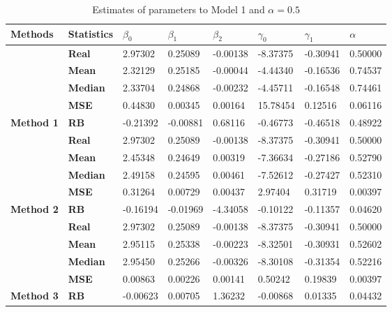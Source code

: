 \begin{table}[h]

\caption{\label{tab:Est_model_1_Alpha0.5}Estimates of parameters to Model 1 and $\alpha=0.5$}
\centering
\begin{tabular}[t]{>{}l>{}lllllll}
\toprule
Methods & Statistics & $\beta_0$ & $\beta_1$ & $\beta_2$ & $\gamma_0$ & $\gamma_1$ & $\alpha$\\
\midrule
 & \textbf{Real} & 2.97302 & 0.25089 & -0.00138 & -8.37375 & -0.30941 & 0.50000\\
\cmidrule{2-8}
 & \textbf{Mean} & 2.32129 & 0.25185 & -0.00044 & -4.44340 & -0.16536 & 0.74537\\
\cmidrule{2-8}
 & \textbf{Median} & 2.33704 & 0.24868 & -0.00232 & -4.45711 & -0.16548 & 0.74461\\
\cmidrule{2-8}
 & \textbf{MSE} & 0.44830 & 0.00345 & 0.00164 & 15.78454 & 0.12516 & 0.06116\\
\cmidrule{2-8}
\multirow{-5}{*}{\raggedright\arraybackslash \textbf{Method 1}} & \textbf{RB} & -0.21392 & -0.00881 & 0.68116 & -0.46773 & -0.46518 & 0.48922\\
\cmidrule{1-8}
 & \textbf{Real} & 2.97302 & 0.25089 & -0.00138 & -8.37375 & -0.30941 & 0.50000\\
\cmidrule{2-8}
 & \textbf{Mean} & 2.45348 & 0.24649 & 0.00319 & -7.36634 & -0.27186 & 0.52790\\
\cmidrule{2-8}
 & \textbf{Median} & 2.49158 & 0.24595 & 0.00461 & -7.52612 & -0.27427 & 0.52310\\
\cmidrule{2-8}
 & \textbf{MSE} & 0.31264 & 0.00729 & 0.00437 & 2.97404 & 0.31719 & 0.00397\\
\cmidrule{2-8}
\multirow{-5}{*}{\raggedright\arraybackslash \textbf{Method 2}} & \textbf{RB} & -0.16194 & -0.01969 & -4.34058 & -0.10122 & -0.11357 & 0.04620\\
\cmidrule{1-8}
 & \textbf{Real} & 2.97302 & 0.25089 & -0.00138 & -8.37375 & -0.30941 & 0.50000\\
\cmidrule{2-8}
 & \textbf{Mean} & 2.95115 & 0.25338 & -0.00223 & -8.32501 & -0.30931 & 0.52602\\
\cmidrule{2-8}
 & \textbf{Median} & 2.95450 & 0.25266 & -0.00326 & -8.30108 & -0.31354 & 0.52216\\
\cmidrule{2-8}
 & \textbf{MSE} & 0.00863 & 0.00226 & 0.00141 & 0.50242 & 0.19839 & 0.00397\\
\cmidrule{2-8}
\multirow{-5}{*}{\raggedright\arraybackslash \textbf{Method 3}} & \textbf{RB} & -0.00623 & 0.00705 & 1.36232 & -0.00868 & 0.01335 & 0.04432\\
\bottomrule
\end{tabular}
\end{table}
